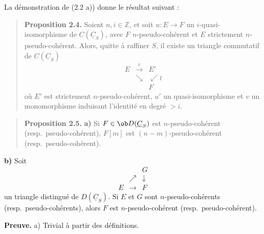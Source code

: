 La démonstration de (2.2 a)) donne le résultat suivant :

\begin{quote}
\textbf{Proposition 2.4.} Soient $n, i \in \mathbb{Z}$, et soit $u : E \to F$ un $i$-quasi-isomorphisme de $C(\underline{C}_S)$, avec $F$ $n$-pseudo-cohérent et $E$ strictement $n$-pseudo-cohérent. Alors, quitte à raffiner $S$, il existe un triangle commutatif de $C(\underline{C}_S)$
\[
\begin{array}{ccc}
E & \xrightarrow{v} & E' \\
& \searrow & \swarrow \wr \\
& & F
\end{array}
\]
où $E'$ est strictement $n$-pseudo-cohérent, $u'$ un quasi-isomorphisme et $v$ un monomorphisme induisant l'identité en degré $> i$.
\end{quote}

\begin{quote}
\textbf{Proposition 2.5.}
\textbf{a)} Si $F \in \ob D(\underline{C}_S)$ est $n$-pseudo-cohérent (resp.\ pseudo-cohérent), $F[m]$ est $(n-m)$-pseudo-cohérent (resp.\ pseudo-cohérent).
\end{quote}

\textbf{b)} Soit
\[
\begin{array}{ccc}
& & G \\
& \nearrow & \downarrow \\
E & \longrightarrow & F
\end{array}
\]
un triangle distingué de $D(\underline{C}_S)$. Si $E$ et $G$ sont $n$-pseudo-cohérents (resp.\ pseudo-cohérents), alors $F$ est $n$-pseudo-cohérent (resp.\ pseudo-cohérent).

\textbf{Preuve.} a) Trivial à partir des définitions.

